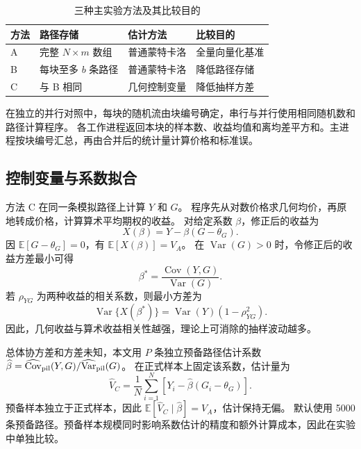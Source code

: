 \begin{table}[!htbp]
\centering\small
\caption{三种主实验方法及其比较目的}
\label{tab:methods}
\begin{tabularx}{\linewidth}{lXXX}
\toprule
方法 & 路径存储 & 估计方法 & 比较目的\\
\midrule
A & 完整 \(N\times m\) 数组 & 普通蒙特卡洛 & 全量向量化基准\\
B & 每块至多 \(b\) 条路径 & 普通蒙特卡洛 & 降低路径存储\\
C & 与 B 相同 & 几何控制变量 & 降低抽样方差\\
\bottomrule
\end{tabularx}
\end{table}

在独立的并行对照中，每块的随机流由块编号确定，串行与并行使用相同随机数和路径计算程序。
各工作进程返回本块的样本数、收益均值和离均差平方和。主进程按块编号汇总，再由合并后的统计量计算价格和标准误。

\subsection{控制变量与系数拟合}
方法 C 在同一条模拟路径上计算 \(Y\) 和 \(G\)。
程序先从对数价格求几何均价，再原地转成价格，计算算术平均期权的收益。
对给定系数 \(\beta\)，修正后的收益为
\begin{equation}
X(\beta)=Y-\beta(G-\theta_G).
\end{equation}
因 \(\mathbb E[G-\theta_G]=0\)，有 \(\mathbb E[X(\beta)]=V_A\)。
在 \(\operatorname{Var}(G)>0\) 时，令修正后的收益方差最小可得
\begin{equation}
\beta^*=\frac{\operatorname{Cov}(Y,G)}{\operatorname{Var}(G)}.
\end{equation}
若 \(\rho_{YG}\) 为两种收益的相关系数，则最小方差为
\begin{equation}
\operatorname{Var}\{X(\beta^*)\}=\operatorname{Var}(Y)(1-\rho_{YG}^2).
\label{eq:optimal}
\end{equation}
因此，几何收益与算术收益相关性越强，理论上可消除的抽样波动越多。

总体协方差和方差未知，本文用 \(P\) 条独立预备路径估计系数
\(\widehat\beta=\widehat{\operatorname{Cov}}_{\rm pil}(Y,G)/
\widehat{\operatorname{Var}}_{\rm pil}(G)\)。
在正式样本上固定该系数，估计量为
\begin{equation}
\widehat V_C=\frac1N\sum_{i=1}^N
\left[Y_i-\widehat\beta(G_i-\theta_G)\right].
\label{eq:cv}
\end{equation}
预备样本独立于正式样本，因此 \(\mathbb E[\widehat V_C\mid\widehat\beta]=V_A\)，估计保持无偏。
默认使用 5000 条预备路径。预备样本规模同时影响系数估计的精度和额外计算成本，因此在实验中单独比较。

